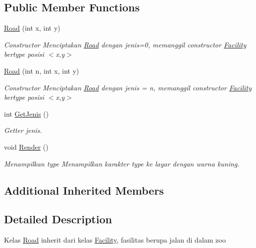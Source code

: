 \subsection*{Public Member Functions}
\begin{DoxyCompactItemize}
\item 
\hyperlink{classRoad_adf96d914718db461bddfbc5e5a0312cc}{Road} (int x, int y)
\begin{DoxyCompactList}\small\item\em Constructor Menciptakan \hyperlink{classRoad}{Road} dengan jenis=0, memanggil constructor \hyperlink{classFacility}{Facility} bertype \textquotesingle{} \textquotesingle{} posisi $<$x,y$>$ \end{DoxyCompactList}\item 
\hyperlink{classRoad_a889d11c1907a97bbe3a3276a3999e375}{Road} (int n, int x, int y)
\begin{DoxyCompactList}\small\item\em Constructor Menciptakan \hyperlink{classRoad}{Road} dengan jenis = n, memanggil constructor \hyperlink{classFacility}{Facility} bertype \textquotesingle{} \textquotesingle{} posisi $<$x,y$>$ \end{DoxyCompactList}\item 
int \hyperlink{classRoad_ae719f438bc09b663920c13b69c9dda15}{Get\+Jenis} ()
\begin{DoxyCompactList}\small\item\em Getter jenis. \end{DoxyCompactList}\item 
void \hyperlink{classRoad_a1a765835fb4bd7c64d12a511a72552b9}{Render} ()\hypertarget{classRoad_a1a765835fb4bd7c64d12a511a72552b9}{}\label{classRoad_a1a765835fb4bd7c64d12a511a72552b9}

\begin{DoxyCompactList}\small\item\em Menampilkan type Menampilkan karakter type ke layar dengan warna kuning. \end{DoxyCompactList}\end{DoxyCompactItemize}
\subsection*{Additional Inherited Members}


\subsection{Detailed Description}
Kelas \hyperlink{classRoad}{Road} inherit dari kelas \hyperlink{classFacility}{Facility}, fasilitas berupa jalan di dalam zoo 

